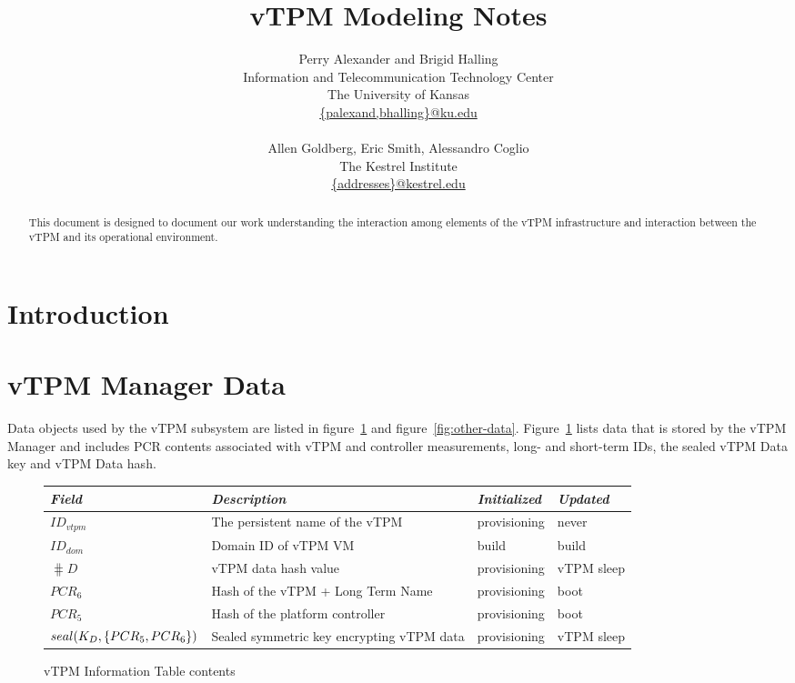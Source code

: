 \documentclass[10pt]{article}
\title{vTPM Modeling Notes}
\author{Perry Alexander and Brigid Halling \\
  Information and Telecommunication Technology Center \\
  The University of Kansas \\
  \url{{palexand,bhalling}@ku.edu} \\
  \\
  Allen Goldberg, Eric Smith, Alessandro Coglio \\
  The Kestrel Institute \\
  \url{{addresses}@kestrel.edu}}
\begin{document}
\maketitle
\tableofcontents
\listoffigures
\listoftables

\newtheorem{invariant}{Invariant}
\newtheorem{post}{Postcondition}
\newtheorem{pre}{Precondition}

\begin{abstract}
  This document is designed to document our work understanding the
  interaction among elements of the vTPM infrastructure and
  interaction between the vTPM and its operational environment.
\end{abstract}

\section{Introduction}

\section{vTPM Manager Data}

Data objects used by the vTPM subsystem are listed in
figure~\ref{fig:vtpm-information-table-format} and
figure~\ref{fig:other-data}.
Figure~\ref{fig:vtpm-information-table-format} lists data that is
stored by the vTPM Manager and includes PCR contents associated with
vTPM and controller measurements, long- and short-term IDs, the sealed
vTPM Data key and vTPM Data hash.

\begin{figure}[hbtp]
  \centering
  \begin{tabular}{llll}
    \emph{Field} & \emph{Description} & \emph{Initialized} &
    \emph{Updated} \\ \hline
    $ID_{vtpm}$ & The persistent name of the vTPM & provisioning &
    never \\
    $ID_{dom}$ & Domain ID of vTPM VM & build & build \\
    $\hash{D}$ & vTPM data hash value & provisioning & vTPM sleep \\
    $PCR_6$ & Hash of the vTPM + Long Term Name & provisioning & boot
    \\
    $PCR_5$ & Hash of the platform controller & provisioning & boot \\
    $seal(K_D,\{PCR_5,PCR_6\})$ & Sealed symmetric key encrypting vTPM data &
    provisioning & vTPM sleep \\
  \end{tabular}
  \caption{vTPM Information Table contents}
  \label{fig:vtpm-information-table-format}
\end{figure}
\end{document}
